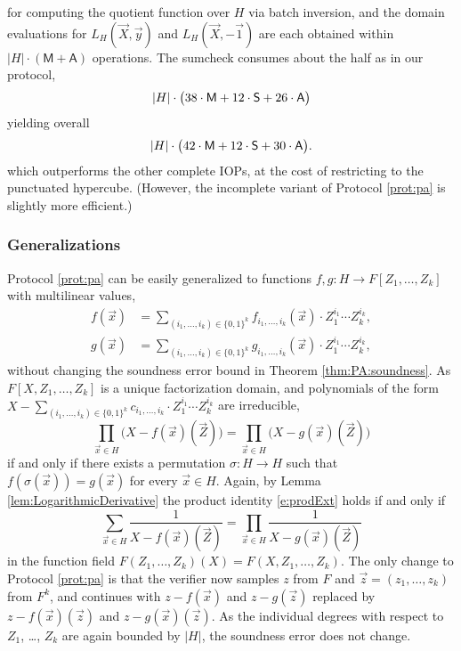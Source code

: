 \documentclass[11pt]{article}
\theoremstyle{definition}
\theoremstyle{remark}
\begin{document}
for computing the quotient function over $H$ via batch inversion, and the domain evaluations for $L_H(\vec X, \vec y)$ and $L_H(\vec X, -\vec 1)$ are each obtained within $|H|\cdot (\mathsf M + \mathsf A)$ operations. 
The sumcheck consumes about the half as in our protocol,
\begin{equation*}
|H| \cdot \big(38 \cdot\textsf M +  12 \cdot\textsf S + 26  \cdot \textsf A\big) 
\end{equation*}
yielding overall 
\begin{equation}
|H| \cdot \big(42 \cdot\textsf M +  12\cdot\textsf S + 30 \cdot \textsf A\big).
\end{equation}
which outperforms the other complete IOPs, at the cost of restricting to the punctuated hypercube.
(However, the incomplete variant of Protocol \ref{prot:pa} is slightly more efficient.)


\subsubsection{Generalizations}
\label{s:pa:Generalizations}

Protocol \ref{prot:pa} can be easily generalized to functions $f,g: H\longrightarrow F[Z_1,\ldots,Z_k]$ with multilinear values, 
\begin{align*}
f(\vec x) &= \sum_{(i_1,\ldots, i_k)\in\{0,1\}^k} f_{i_1,\ldots, i_k}(\vec x)\cdot Z_1^{i_1}\cdots Z_k^{i_k},
\\
g(\vec x) &= \sum_{(i_1,\ldots, i_k)\in\{0,1\}^k} g_{i_1,\ldots, i_k}(\vec x)\cdot Z_1^{i_1}\cdots Z_k^{i_k},
\end{align*}
without changing the soundness error bound in Theorem \ref{thm:PA:soundness}.
As $F[X,Z_1,\ldots, Z_k]$ is a unique factorization domain, and polynomials of the form $X -  \sum_{(i_1,\ldots, i_k)\in\{0,1\}^k} c_{i_1,\ldots, i_k}\cdot Z_1^{i_1}\cdots Z_k^{i_k}$ are irreducible,
\begin{equation}
\label{e:prodExt}
\prod_{\vec x\in H} \Big(X -  f(\vec x)(\vec Z)\big) = \prod_{\vec x\in H} \big(X - g(\vec x)(\vec Z)\big)
\end{equation}
if and only if there exists a permutation $\sigma:H\rightarrow H$ such that $f(\sigma(\vec x)) = g(\vec x)$ for every $\vec x\in H$.
Again, by Lemma \ref{lem:LogarithmicDerivative} the product identity \eqref{e:prodExt} holds if and only if 
\begin{equation}
\label{e:sumExt}
\sum_{\vec x\in H} \frac{1}{X -  f(\vec x)(\vec Z)} = \prod_{\vec x\in H} \frac{1}{X - g(\vec x)(\vec Z)}
\end{equation}
in the function field $F(Z_1,\ldots, Z_k)(X) = F(X,Z_1,\ldots, Z_k)$.
The only change to Protocol \ref{prot:pa} is that the verifier now samples $z$ from $F$ and $\vec z = (z_1,\ldots, z_k)$ from $F^k$, and continues with $z - f(\vec x)$ and $z - g(\vec z)$ replaced by $z - f(\vec x)(\vec z)$ and $z - g(\vec x)(\vec z)$.
As the individual degrees with respect to $Z_1$, \ldots, $Z_k$ are again bounded by $|H|$, the soundness error does not change.
\end{document}
